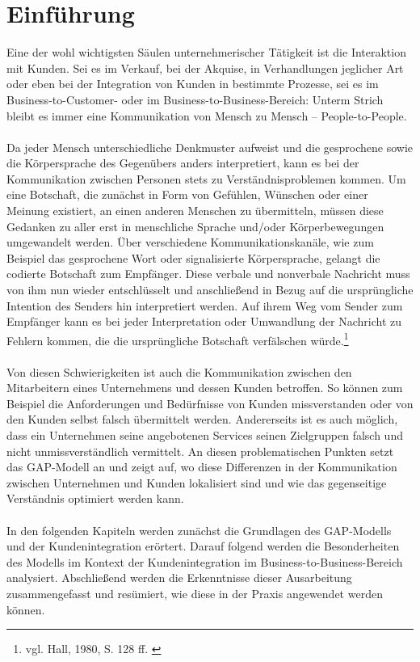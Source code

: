 \chapter{Einführung}
\label{kapitel1}
Eine der wohl wichtigsten Säulen unternehmerischer Tätigkeit ist die Interaktion mit Kunden. Sei es im Verkauf, bei der Akquise, in Verhandlungen jeglicher Art oder eben bei der Integration von Kunden in bestimmte Prozesse, sei es im Business-to-Customer- oder im Business-to-Business-Bereich: Unterm Strich bleibt es immer eine Kommunikation von Mensch zu Mensch -- People-to-People.
\\ \\
Da jeder Mensch unterschiedliche Denkmuster aufweist und die gesprochene sowie die Körpersprache des Gegenübers anders interpretiert, kann es bei der Kommunikation zwischen Personen stets zu Verständnisproblemen kommen. Um eine Botschaft, die zunächst in Form von Gefühlen, Wünschen oder einer Meinung existiert, an einen anderen Menschen zu übermitteln, müssen diese Gedanken zu aller erst in menschliche Sprache und/oder Körperbewegungen umgewandelt werden. Über verschiedene Kommunikationskanäle, wie zum Beispiel das gesprochene Wort oder signalisierte Körpersprache, gelangt die codierte Botschaft zum Empfänger. Diese verbale und nonverbale Nachricht muss von ihm nun wieder entschlüsselt und anschließend in Bezug auf die ursprüngliche Intention des Senders hin interpretiert werden. Auf ihrem Weg vom Sender zum Empfänger kann es bei jeder Interpretation oder Umwandlung der Nachricht zu Fehlern kommen, die die ursprüngliche Botschaft verfälschen würde.\footnote{vgl. Hall, 1980, S. 128 ff. \cite{Hall1980}}
\\ \\
Von diesen Schwierigkeiten ist auch die Kommunikation zwischen den Mitarbeitern eines Unternehmens und dessen Kunden betroffen. So können zum Beispiel die Anforderungen und Bedürfnisse von Kunden missverstanden oder von den Kunden selbst falsch übermittelt werden. Andererseits ist es auch möglich, dass ein Unternehmen seine angebotenen Services seinen Zielgruppen falsch und nicht unmissverständlich vermittelt. An diesen problematischen Punkten setzt das GAP-Modell an und zeigt auf, wo diese Differenzen in der Kommunikation zwischen Unternehmen und Kunden lokalisiert sind und wie das gegenseitige Verständnis optimiert werden kann.
\\ \\
In den folgenden Kapiteln werden zunächst die Grundlagen des GAP-Modells und der Kundenintegration erörtert. Darauf folgend werden die Besonderheiten des Modells im Kontext der Kundenintegration im Business-to-Business-Bereich analysiert. Abschließend werden die Erkenntnisse dieser Ausarbeitung zusammengefasst und resümiert, wie diese in der Praxis angewendet werden können.



